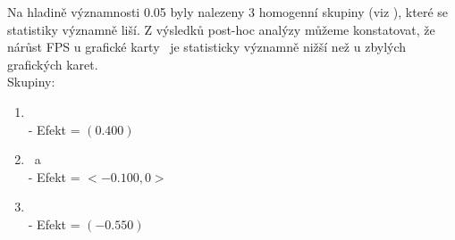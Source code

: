 \begin{enumerate}[label=\alph*)]
\begin{minipage}{0.94\textwidth}
        \vspace{1em}
        \label{tab:letter-test}
        \vspace{0.5em}
        \renewcommand{\arraystretch}{1.3}
        \vspace{1em}

        Na hladině významnosti 0.05 byly nalezeny 3 homogenní skupiny (viz ), které se statistiky významně liší.
        Z výsledků post-hoc analýzy můžeme konstatovat, že nárůst FPS u grafické karty \amdCardSest\ je statisticky významně nižší než u zbylých grafických karet. \\

        Skupiny:
        \begin{enumerate}
            \item \nvidiaCardTri\ \\ - Efekt = $(0.400)$
            \item \amdCardSedm\ a \nvidiaCardDva\ \\ - Efekt = $<-0.100, 0>$
            \item \amdCardSest\ \\ - Efekt = $(-0.550)$
        \end{enumerate}
    \end{minipage}
\end{enumerate}

\endinput